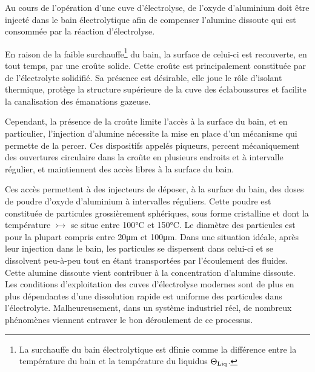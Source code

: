 
Au cours de l'opération d'une cuve d'électrolyse, de l'oxyde
d'aluminium doit être injecté dans le bain électrolytique afin
de compenser l'alumine dissoute qui est consommée par la
réaction d'électrolyse.

En raison de la faible surchauffe\footnote{La surchauffe du bain
  électrolytique est d\'finie comme la différence entre la température
  du bain et la température du liquidus $\Theta_\text{Liq}$.} du bain, la surface
de celui-ci est recouverte, en tout temps, par une croûte
solide. Cette croûte est principalement constituée par de
l'électrolyte solidifié. Sa présence est
désirable, elle joue le rôle d'isolant thermique, protège la structure
supérieure de la cuve des éclaboussures et facilite la canalisation
des émanations gazeuse.

Cependant, la présence de la croûte limite l'accès à la surface du
bain, et en particulier, l'injection d'alumine nécessite la mise en
place d'un mécanisme qui permette de la percer. Ces dispositifs
appelés piqueurs, percent mécaniquement des ouvertures circulaire dans
la croûte en plusieurs endroits et à intervalle régulier, et
maintiennent des accès libres à la surface du bain.

Ces accès permettent à des injecteurs de déposer, à la surface du
bain, des doses de poudre d'oxyde d'aluminium à intervalles
réguliers. Cette poudre est constituée de particules grossièrement
sphériques, sous forme cristalline et dont la température $\tinj$ se
situe entre \num{100}\si{\celsius} et \num{150}\si{\celsius}. Le
diamètre des particules est pour la plupart compris entre
\num{20}\si{\micro\meter} et \num{100}\si{\micro\meter}.
Dans une situation idéale, après leur injection dans le bain, les
particules se dispersent dans celui-ci et se dissolvent peu-à-peu tout
en étant transportées par l'écoulement des fluides. Cette alumine
dissoute vient contribuer à la concentration d'alumine dissoute. Les
conditions d'exploitation des cuves d'électrolyse modernes sont de
plus en plus dépendantes d'une dissolution rapide est uniforme des
particules dans l'électrolyte. Malheureusement, dans un système
industriel réel, de nombreux phénomènes viennent entraver le bon
déroulement de ce processus.

